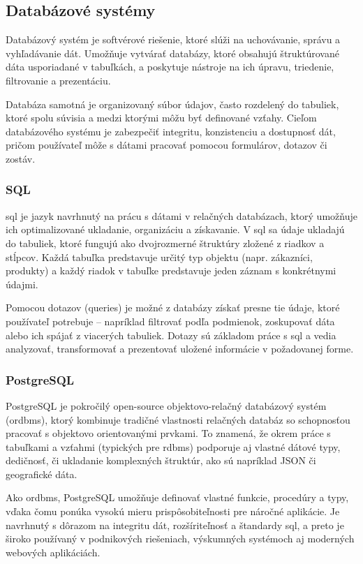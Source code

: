  \subsection{Databázové systémy}
 Databázový systém je softvérové riešenie, ktoré slúži na uchovávanie, správu a vyhľadávanie dát. 
 Umožňuje vytvárať databázy, ktoré obsahujú štruktúrované dáta usporiadané v tabuľkách, a poskytuje nástroje na ich úpravu, triedenie, filtrovanie a prezentáciu.
 
 Databáza samotná je organizovaný súbor údajov, často rozdelený do tabuliek, ktoré spolu súvisia a medzi ktorými môžu byť definované vzťahy. 
 Cieľom databázového systému je zabezpečiť integritu, konzistenciu a dostupnosť dát, pričom používateľ môže s dátami pracovať pomocou formulárov, dotazov či zostáv.\cite{databazovesystemy}
 
 \subsubsection{SQL}
 \acrfull{sql} je jazyk navrhnutý na prácu s dátami v relačných databázach, ktorý umožňuje ich optimalizované ukladanie, organizáciu a získavanie.
 V \acrshort{sql} sa údaje ukladajú do tabuliek, ktoré fungujú ako dvojrozmerné štruktúry zložené z riadkov a stĺpcov. 
 Každá tabuľka predstavuje určitý typ objektu (napr. zákazníci, produkty) a každý riadok v tabuľke predstavuje jeden záznam s konkrétnymi údajmi.
 
 Pomocou dotazov (queries) je možné z databázy získať presne tie údaje, ktoré používateľ potrebuje – napríklad filtrovať podľa podmienok, zoskupovať dáta alebo ich spájať z viacerých tabuliek.
 Dotazy sú základom práce s \acrshort{sql} a vedia analyzovať, transformovať a prezentovať uložené informácie v požadovanej forme.\cite{sql}
 
 \subsubsection{PostgreSQL}
 PostgreSQL je pokročilý open-source objektovo-relačný databázový systém (\acrshort{ordbms}), ktorý kombinuje tradičné vlastnosti relačných databáz so schopnosťou pracovať s objektovo orientovanými prvkami. 
 To znamená, že okrem práce s tabuľkami a vzťahmi (typických pre \acrfull{rdbms}) podporuje aj vlastné dátové typy, dedičnosť, či ukladanie komplexných štruktúr, ako sú napríklad JSON či geografické dáta.
 
 Ako \acrshort{ordbms}, PostgreSQL umožňuje definovať vlastné funkcie, procedúry a typy, vďaka čomu ponúka vysokú mieru prispôsobiteľnosti pre náročné aplikácie. 
 Je navrhnutý s dôrazom na integritu dát, rozšíriteľnosť a štandardy \acrshort{sql}, a preto je široko používaný v podnikových riešeniach, výskumných systémoch aj moderných webových aplikáciách.\cite{postgre}
